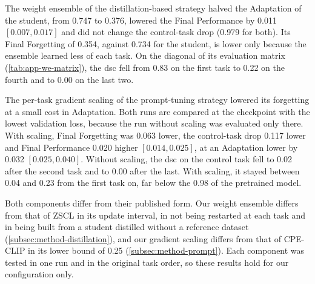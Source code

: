 The weight ensemble of the distillation-based strategy halved the Adaptation of the student, from 0.747 to 0.376, lowered the Final Performance by 0.011 $[0.007, 0.017]$ and did not change the control-task drop (0.979 for both).
Its Final Forgetting of 0.354, against 0.734 for the student, is lower only because the ensemble learned less of each task.
On the diagonal of its evaluation matrix (\cref{tab:app-we-matrix}), the \gls{dsc} fell from 0.83 on the first task to 0.22 on the fourth and to 0.00 on the last two.

{\captionsetup{list=no}}

The per-task gradient scaling of the prompt-tuning strategy lowered its forgetting at a small cost in Adaptation.
Both runs are compared at the checkpoint with the lowest validation loss, because the run without scaling was evaluated only there.
With scaling, Final Forgetting was 0.063 lower, the control-task drop 0.117 lower and Final Performance 0.020 higher $[0.014, 0.025]$, at an Adaptation lower by 0.032 $[0.025, 0.040]$.
Without scaling, the \gls{dsc} on the control task fell to 0.02 after the second task and to 0.00 after the last.
With scaling, it stayed between 0.04 and 0.23 from the first task on, far below the 0.98 of the pretrained model.

Both components differ from their published form.
Our weight ensemble differs from that of ZSCL in its update interval, in not being restarted at each task and in being built from a student distilled without a reference dataset (\cref{subsec:method-distillation}), and our gradient scaling differs from that of CPE-CLIP in its lower bound of 0.25 (\cref{subsec:method-prompt}).
Each component was tested in one run and in the original task order, so these results hold for our configuration only.

